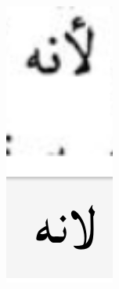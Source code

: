 \begin{figure}[h]
\begin{subfigure}[b]{0.3\linewidth}
	\includegraphics[width=\textwidth]{images/image29.png}

\end{subfigure}
\end{figure}
